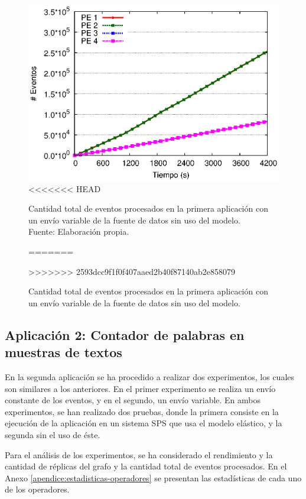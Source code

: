 \begin{figure}[!ht]
	\centering
	\captionsetup{justification=centering}
    \includegraphics[scale=0.7]{images/exp/app1/normal/sm/eventCount.eps}
<<<<<<< HEAD
    \caption[Cantidad total de eventos procesados en la primera aplicación con un envío variable de la fuente de datos sin uso del modelo.]{Cantidad total de eventos procesados en la primera aplicación con un envío variable de la fuente de datos sin uso del modelo.\\Fuente: Elaboración propia.}
=======
    \caption{Cantidad total de eventos procesados en la primera aplicaci\'on con un env\'io variable de la fuente de datos sin uso del modelo.}
>>>>>>> 2593dcc9f1f0f407aaed2b40f87140ab2e858079
    \label{fig:app1-normal-eventCount-sm}
\end{figure}

\subsection{Aplicaci\'on 2: Contador de palabras en muestras de textos}
En la segunda aplicaci\'on se ha procedido a realizar dos experimentos, los cuales son similares a los anteriores. En el primer experimento se realiza un env\'io constante de los eventos, y en el segundo, un env\'io variable. En ambos experimentos, se han realizado dos pruebas, donde la primera consiste en la ejecuci\'on de la aplicaci\'on en un sistema SPS que usa el modelo el\'astico, y la segunda sin el uso de \'este.

\normalsize{Para el an\'alisis de los experimentos, se ha considerado el rendimiento y la cantidad de r\'eplicas del grafo y la cantidad total de eventos procesados. En el Anexo} \ref{apendice:estadisticas-operadores} \normalsize{se presentan las estad\'isticas de cada uno de los operadores.}

